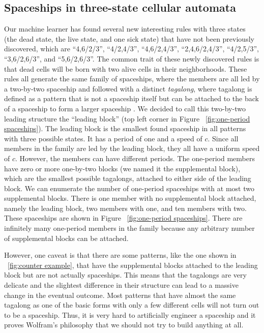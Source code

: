 \documentclass[12pt]{article}
\numberwithin{figure}{section} %
\begin{document}
\subsection{Spaceships in three-state cellular automata}
Our machine learner has found several new interesting rules with three states (the dead state, the live state, and one sick state) that have not been previously discovered, which are “4,6/2/3”, “4/2,4/3”, “4,6/2,4/3”, “2,4,6/2,4/3”, “4/2,5/3”, “3,6/2,6/3”, and “5,6/2,6/3”. The common trait of these newly discovered rules is that dead cells will be born with two alive cells in their neighborhoods. These rules all generate the same family of spaceships, where the members are all led by a two-by-two spaceship and followed with a distinct \textit{tagalong}, where tagalong is defined as a pattern that is not a spaceship itself but can be attached to the back of a spaceship to form a larger spaceship \cite{spaceship}. We decided to call this two-by-two leading structure the “leading block” (top left corner in Figure ~\ref{fig:one-period spaceships}). The leading block is the smallest found spaceship in all patterns with three possible states. It has a period of one and a speed of $c$. Since all members in the family are led by the leading block, they all have a uniform speed of $c$. However, the members can have different periods. The one-period members have zero or more one-by-two blocks (we named it the supplemental block), which are the smallest possible tagalongs, attached to either side of the leading block. We can enumerate the number of one-period spaceships with at most two supplemental blocks. There is one member with no supplemental block attached, namely the leading block, two members with one, and ten members with two. These spaceships are shown in Figure ~\ref{fig:one-period spaceships}. There are infinitely many one-period members in the family because any arbitrary number of supplemental blocks can be attached. 

However, one caveat is that there are some patterns, like the one shown in ~\ref{fig:counter example}, that have the supplemental blocks attached to the leading block but are not actually spaceships. This means that the tagalongs are very delicate and the slightest difference in their structure can lead to a massive change in the eventual outcome. Most patterns that have almost the same tagalong as one of the basic forms with only a few different cells will not turn out to be a spaceship. Thus, it is very hard to artificially engineer a spaceship and it proves Wolfram's philosophy that we should not try to build anything at all. 
\end{document}
